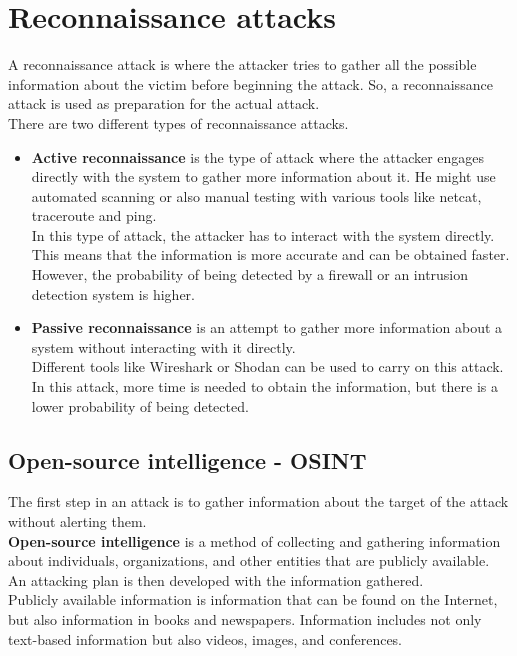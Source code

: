 \chapter{Reconnaissance attacks}
A reconnaissance attack is where the attacker tries to gather all the possible information about the victim before beginning the attack. So, a reconnaissance attack is used as preparation for the actual attack. \\
There are two different types of reconnaissance attacks.
\begin{itemize}
    \item \textbf{Active reconnaissance} is the type of attack where the attacker engages directly with the system to gather more information about it. He might use automated scanning or also manual testing with various tools like netcat, traceroute and ping. \\ In this type of attack, the attacker has to interact with the system directly. This means that the information is more accurate and can be obtained faster. However, the probability of being detected by a firewall or an intrusion detection system is higher.
    \item \textbf{Passive reconnaissance} is an attempt to gather more information about a system without interacting with it directly. \\ Different tools like Wireshark or Shodan can be used to carry on this attack. In this attack, more time is needed to obtain the information, but there is a lower probability of being detected.
\end{itemize}
\newpage
\section{Open-source intelligence - OSINT}
The first step in an attack is to gather information about the target of the attack without alerting them. \\
\textbf{Open-source intelligence} is a method of collecting and gathering information about individuals, organizations, and other entities that are publicly available. 
An attacking plan is then developed with the information gathered.\\
Publicly available information is information that can be found on the Internet, but also information in books and newspapers.
 Information includes not only text-based information but also videos, images, and conferences.

